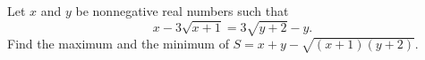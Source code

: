 Let $x$ and $y$ be nonnegative real numbers such that
\[
x-3\sqrt{x+1}=3\sqrt{y+2}-y .
\]
Find the maximum and the minimum of $S=x+y-\sqrt{(x+1)(y+2)}$.
